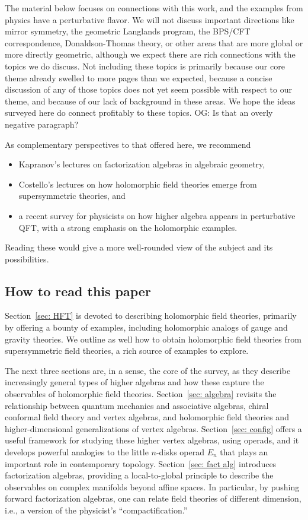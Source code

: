 \documentclass[11pt]{amsart}
\def\owen#1{{\textcolor{violet!50!black}{OG: {#1}}}}
\begin{document}
The material below focuses on connections with this work,
and the examples from physics have a perturbative flavor.
We will not discuss important directions like mirror symmetry, the geometric Langlands program, the BPS/CFT correspondence, Donaldson-Thomas theory, or other areas that are more global or more directly geometric,
although we expect there are rich connections with the topics we do discuss.
Not including these topics is primarily because our core theme already swelled to more pages than we expected, 
because a concise discussion of any of those topics does not yet seem possible with respect to our theme,
and because of our lack of background in these areas.
We hope the ideas surveyed here do connect profitably to these topics.
\owen{Is that an overly negative paragraph?}

As complementary perspectives to that offered here, we recommend
\begin{itemize}
\item Kapranov's lectures \cite{KapLect} on factorization algebras in algebraic geometry,
\item Costello's lectures \cite{CosScheim} on how holomorphic field theories emerge from supersymmetric theories, and
\item a recent survey \cite{GKW} for physicists on how higher algebra appears in perturbative QFT, with a strong emphasis on the holomorphic examples.
\end{itemize}
Reading these would give a more well-rounded view of the subject and its possibilities.

\subsection{How to read this paper}

Section~\ref{sec: HFT} is devoted to describing holomorphic field theories, primarily by offering a bounty of examples, including holomorphic analogs of gauge and gravity theories.
We outline as well how to obtain holomorphic field theories from supersymmetric field theories,
a rich source of examples to explore.

The next three sections are, in a sense, the core of the survey,
as they describe increasingly general types of higher algebras and how these capture the observables of holomorphic field theories.
Section~\ref{sec: algebra} revisits the relationship between quantum mechanics and associative algebras,
chiral conformal field theory and vertex algebras,
and holomorphic field theories and higher-dimensional generalizations of vertex algebras.
Section~\ref{sec: config} offers a useful framework for studying these higher vertex algebras,
using operads,
and it develops powerful analogies to the little $n$-disks operad $E_n$ that plays an important role in contemporary topology.
Section~\ref{sec: fact alg} introduces factorization algebras,
providing a local-to-global principle to describe the observables on complex manifolds beyond affine spaces.
In particular, by pushing forward factorization algebras,
one can relate field theories of different dimension,
i.e., a version of the physicist's ``compactification.''
\end{document}
